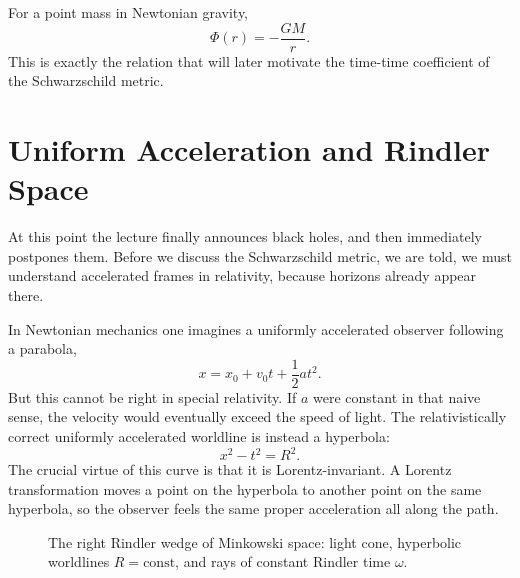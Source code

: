 For a point mass in Newtonian gravity,
\begin{equation}
\Phi(r)=-\frac{GM}{r}.
\end{equation}
This is exactly the relation that will later motivate the time-time coefficient of the Schwarzschild metric.

\section{Uniform Acceleration and Rindler Space}

At this point the lecture finally announces black holes, and then immediately postpones them. Before we discuss the Schwarzschild metric, we are told, we must understand accelerated frames in relativity, because horizons already appear there.

In Newtonian mechanics one imagines a uniformly accelerated observer following a parabola,
\[
x=x_0+v_0 t+\frac12 a t^2.
\]
But this cannot be right in special relativity. If \(a\) were constant in that naive sense, the velocity would eventually exceed the speed of light. The relativistically correct uniformly accelerated worldline is instead a hyperbola:
\begin{equation}
x^2-t^2=R^2.
\end{equation}
The crucial virtue of this curve is that it is Lorentz-invariant. A Lorentz transformation moves a point on the hyperbola to another point on the same hyperbola, so the observer feels the same proper acceleration all along the path.

\begin{figure}[t]
\centering
{}
\caption{The right Rindler wedge of Minkowski space: light cone, hyperbolic worldlines \(R=\text{const}\), and rays of constant Rindler time \(\omega\).}
\end{figure}

